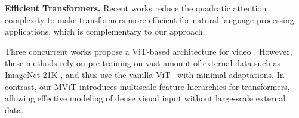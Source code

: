 \documentclass[10pt,twocolumn,letterpaper]{article}
\begin{document}
\noindent\textbf{Efficient Transformers.} Recent works \cite{wang2020linformer, kitaev2020reformer, choromanski2020rethinking, tay2020sparse, dai2020funnel, child2019generating, li2020linear} reduce the quadratic attention complexity to make transformers more efficient for natural language processing applications, which is complementary to our approach.

Three concurrent works propose a ViT-based architecture for video \cite{neimark2021video, bertasius2021space,arnab2021vivit}. However, these methods rely on pre-training on vast amount of external data such as ImageNet-21K \cite{deng2009imagenet}, and thus use the vanilla ViT~\cite{dosovitskiy2020image} with minimal adaptations. In contrast, our MViT introduces multiscale feature hierarchies for transformers, allowing effective modeling of dense visual input without large-scale external data. 

\label{sec:related_work}


\newcommand{\blocks}[3]{\multirow{3}{*}{\(\left[\begin{array}{c}\text{1$\times$1$^\text{2}$, #2}\\[-.1em] \text{1$\times$3$^\text{2}$, #2}\\[-.1em] \text{1$\times$1$^\text{2}$, #1}\end{array}\right]\)$\times$#3}
}
\newcommand{\blocket}[4]{\multirow{3}{*}{\(\left[\begin{array}{c}\text{1$\times$1$^\text{2}$, #1}\\[-.1em] \text{$3$$\times$3$^\text{2}$, #2}\\[-.1em] \text{1$\times$1$^\text{2}$, #3}\end{array}\right]\)$\times$#4}
}
\newcommand{\blockatt}[3]{\multirow{2}{*}{\(\left[\begin{array}{c}\text{MHA(\wcolor{#1})}\\[-.1em] \text{MLP(\wcolor{#2})}\end{array}\right]\)$\times$#3}
}
\newcommand{\blockatta}[3]{\multirow{2}{*}{\(\left[\begin{array}{c}\text{\eicolor{MHPA}(\wcolor{#1})}\\[-.1em] \text{MLP(\wcolor{#2})}\end{array}\right]\)$\times$#3}
}

\newcommand{\blockt}[3]{\multirow{3}{*}{\(\left[\begin{array}{c}\text{\underline{3$\times$1$^\text{2}$}, #2}\\[-.1em] \text{1$\times$3$^\text{2}$, #2}\\[-.1em] \text{1$\times$1$^\text{2}$, #1}\end{array}\right]\)$\times$#3}
}
\newcommand{\outsizes}[7]{\multirow{#7}{*}{\(\begin{array}{c} \text{\emph{Slow}}: \text{#1$\times$#2$^\text{2}$}\\[-.1em] \text{\emph{Fast}}: \text{#4$\times$#5$^\text{2}$}\end{array}\)}
}
\end{document}
